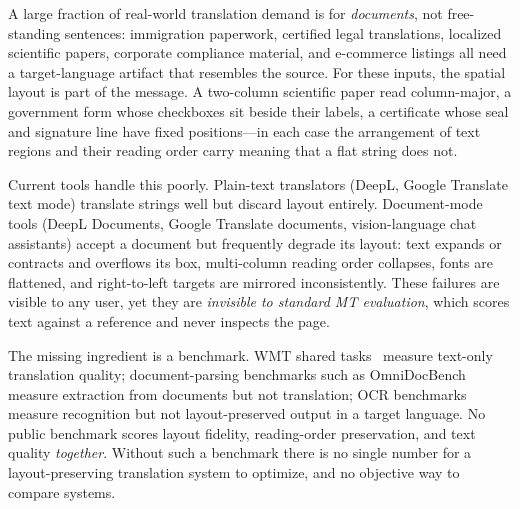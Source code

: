 \documentclass[11pt]{article}
\begin{document}
A large fraction of real-world translation demand is for \emph{documents}, not
free-standing sentences: immigration paperwork, certified legal translations,
localized scientific papers, corporate compliance material, and e-commerce
listings all need a target-language artifact that resembles the source. For
these inputs, the spatial layout is part of the message. A two-column scientific
paper read column-major, a government form whose checkboxes sit beside their
labels, a certificate whose seal and signature line have fixed positions---in
each case the arrangement of text regions and their reading order carry meaning
that a flat string does not.

Current tools handle this poorly. Plain-text translators (DeepL, Google
Translate text mode) translate strings well but discard layout entirely.
Document-mode tools (DeepL Documents, Google Translate documents, vision-language
chat assistants) accept a document but frequently degrade its layout:
text expands or contracts and overflows its box, multi-column reading order
collapses, fonts are flattened, and right-to-left targets are mirrored
inconsistently. These failures are visible to any user, yet they are
\emph{invisible to standard MT evaluation}, which scores text against a
reference and never inspects the page.

The missing ingredient is a benchmark. WMT shared tasks~\citep{kocmi2023wmt}
measure text-only translation quality; document-parsing benchmarks such as
OmniDocBench~\citep{ouyang2024omnidocbench} measure extraction from documents
but not translation; OCR benchmarks measure recognition but not layout-preserved
output in a target language. No public benchmark scores layout fidelity,
reading-order preservation, and text quality \emph{together}. Without such a
benchmark there is no single number for a layout-preserving translation system
to optimize, and no objective way to compare systems.
\end{document}
